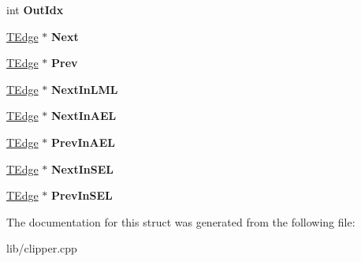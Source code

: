 \begin{DoxyCompactItemize}
int {\bfseries Out\+Idx}
\item 
\mbox{\label{struct_clipper_lib_1_1_t_edge_af63cea19f1590922691d1a3a90e4173d}} 
\hyperlink{struct_clipper_lib_1_1_t_edge}{T\+Edge} $\ast$ {\bfseries Next}
\item 
\mbox{\label{struct_clipper_lib_1_1_t_edge_a2713de57bcc285aaee2b9e1f5023bebc}} 
\hyperlink{struct_clipper_lib_1_1_t_edge}{T\+Edge} $\ast$ {\bfseries Prev}
\item 
\mbox{\label{struct_clipper_lib_1_1_t_edge_a1d0ad253e18e6fc82ed025e3d69b33de}} 
\hyperlink{struct_clipper_lib_1_1_t_edge}{T\+Edge} $\ast$ {\bfseries Next\+In\+L\+ML}
\item 
\mbox{\label{struct_clipper_lib_1_1_t_edge_a7281f59250f53e96099c1f636350bbd5}} 
\hyperlink{struct_clipper_lib_1_1_t_edge}{T\+Edge} $\ast$ {\bfseries Next\+In\+A\+EL}
\item 
\mbox{\label{struct_clipper_lib_1_1_t_edge_a69a6d91641e91d87bf8fb658ab5b80d1}} 
\hyperlink{struct_clipper_lib_1_1_t_edge}{T\+Edge} $\ast$ {\bfseries Prev\+In\+A\+EL}
\item 
\mbox{\label{struct_clipper_lib_1_1_t_edge_a167cd4d991d27f344d875ad6fd43b862}} 
\hyperlink{struct_clipper_lib_1_1_t_edge}{T\+Edge} $\ast$ {\bfseries Next\+In\+S\+EL}
\item 
\mbox{\label{struct_clipper_lib_1_1_t_edge_aa38f572c772d0bae50323f7890334c5f}} 
\hyperlink{struct_clipper_lib_1_1_t_edge}{T\+Edge} $\ast$ {\bfseries Prev\+In\+S\+EL}
\end{DoxyCompactItemize}


The documentation for this struct was generated from the following file\+:\begin{DoxyCompactItemize}
\item 
lib/clipper.\+cpp\end{DoxyCompactItemize}
